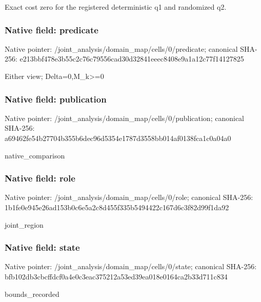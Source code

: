 \documentclass[10pt,a4paper]{article}
\begin{document}
\begingroup\raggedright\sloppy Exact cost zero for the registered deterministic q1 and randomized q2.\par\endgroup

\subsubsection{Native field: predicate}
Native pointer: /joint\_\allowbreak{}analysis/domain\_\allowbreak{}map/cells/0/predicate; canonical SHA-256: e213bbf478e3b55c2c76c79556cad30d32841eeec8408e9a1a12c77f14127825

\begingroup\raggedright\sloppy Either view;\allowbreak{} Delta=\allowbreak{}0,\allowbreak{}M\_\allowbreak{}k>=\allowbreak{}0\par\endgroup

\subsubsection{Native field: publication}
Native pointer: /joint\_\allowbreak{}analysis/domain\_\allowbreak{}map/cells/0/publication; canonical SHA-256: a69462fe54b27704b355b6dec96d5354e1787d3558bb014af0138fca1c0a04a0

\begingroup\raggedright\sloppy native\_\allowbreak{}comparison\par\endgroup

\subsubsection{Native field: role}
Native pointer: /joint\_\allowbreak{}analysis/domain\_\allowbreak{}map/cells/0/role; canonical SHA-256: 1b1fe0e945e26ad153b0c6e5a2c8d455f335b5494422c167d6c3f82d99f1da92

\begingroup\raggedright\sloppy joint\_\allowbreak{}region\par\endgroup

\subsubsection{Native field: state}
Native pointer: /joint\_\allowbreak{}analysis/domain\_\allowbreak{}map/cells/0/state; canonical SHA-256: bfb102db3cbcffdcf0a4e0c3eac375212a53ed39ea018e0164ca2b33d711c834

\begingroup\raggedright\sloppy bounds\_\allowbreak{}recorded\par\endgroup
\end{document}

